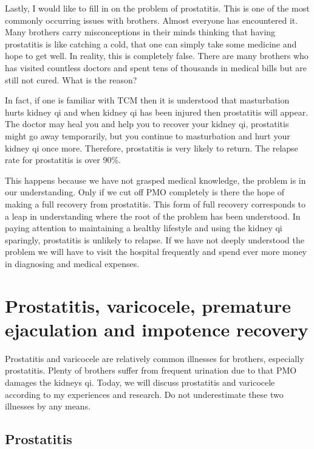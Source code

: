 \documentclass[
]{book}
\begin{document}
Lastly, I would like to fill in on the problem of prostatitis. This is one of the most commonly occurring issues with brothers. Almost everyone has encountered it. Many brothers carry misconceptions in their minds thinking that having prostatitis is like catching a cold, that one can simply take some medicine and hope to get well. In reality, this is completely false. There are many brothers who has visited countless doctors and spent tens of thousands in medical bills but are still not cured. What is the reason?

In fact, if one is familiar with TCM then it is understood that masturbation hurts kidney qi and when kidney qi has been injured then prostatitis will appear. The doctor may heal you and help you to recover your kidney qi, prostatitis might go away temporarily, but you continue to masturbation and hurt your kidney qi once more. Therefore, prostatitis is very likely to return. The relapse rate for prostatitis is over 90\%.

This happens because we have not grasped medical knowledge, the problem is in our understanding. Only if we cut off PMO completely is there the hope of making a full recovery from prostatitis. This form of full recovery corresponds to a leap in understanding where the root of the problem has been understood. In paying attention to maintaining a healthy lifestyle and using the kidney qi sparingly, prostatitis is unlikely to relapse. If we have not deeply understood the problem we will have to visit the hospital frequently and spend ever more money in diagnosing and medical expenses.

\hypertarget{prostatitis-varicocele-premature-ejaculation-and-impotence-recovery}{%
\chapter{Prostatitis, varicocele, premature ejaculation and impotence recovery}\label{prostatitis-varicocele-premature-ejaculation-and-impotence-recovery}}

Prostatitis and varicocele are relatively common illnesses for brothers, especially prostatitis. Plenty of brothers suffer from frequent urination due to that PMO damages the kidneys qi. Today, we will discuss prostatitis and varicocele according to my experiences and research. Do not underestimate these two illnesses by any means.

\hypertarget{prostatitis}{%
\section{Prostatitis}\label{prostatitis}}
\end{document}
